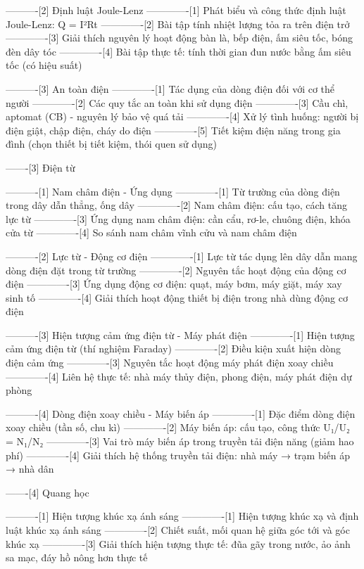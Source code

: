 ----------[2] Định luật Joule-Lenz
-------------[1] Phát biểu và công thức định luật Joule-Lenz: Q = I²Rt
-------------[2] Bài tập tính nhiệt lượng tỏa ra trên điện trở
-------------[3] Giải thích nguyên lý hoạt động bàn là, bếp điện, ấm siêu tốc, bóng đèn dây tóc
-------------[4] Bài tập thực tế: tính thời gian đun nước bằng ấm siêu tốc (có hiệu suất)

----------[3] An toàn điện
-------------[1] Tác dụng của dòng điện đối với cơ thể người
-------------[2] Các quy tắc an toàn khi sử dụng điện
-------------[3] Cầu chì, aptomat (CB) - nguyên lý bảo vệ quá tải
-------------[4] Xử lý tình huống: người bị điện giật, chập điện, cháy do điện
-------------[5] Tiết kiệm điện năng trong gia đình (chọn thiết bị tiết kiệm, thói quen sử dụng)

-------[3] Điện từ

----------[1] Nam châm điện - Ứng dụng
-------------[1] Từ trường của dòng điện trong dây dẫn thẳng, ống dây
-------------[2] Nam châm điện: cấu tạo, cách tăng lực từ
-------------[3] Ứng dụng nam châm điện: cần cẩu, rơ-le, chuông điện, khóa cửa từ
-------------[4] So sánh nam châm vĩnh cửu và nam châm điện

----------[2] Lực từ - Động cơ điện
-------------[1] Lực từ tác dụng lên dây dẫn mang dòng điện đặt trong từ trường
-------------[2] Nguyên tắc hoạt động của động cơ điện
-------------[3] Ứng dụng động cơ điện: quạt, máy bơm, máy giặt, máy xay sinh tố
-------------[4] Giải thích hoạt động thiết bị điện trong nhà dùng động cơ điện

----------[3] Hiện tượng cảm ứng điện từ - Máy phát điện
-------------[1] Hiện tượng cảm ứng điện từ (thí nghiệm Faraday)
-------------[2] Điều kiện xuất hiện dòng điện cảm ứng
-------------[3] Nguyên tắc hoạt động máy phát điện xoay chiều
-------------[4] Liên hệ thực tế: nhà máy thủy điện, phong điện, máy phát điện dự phòng

----------[4] Dòng điện xoay chiều - Máy biến áp
-------------[1] Đặc điểm dòng điện xoay chiều (tần số, chu kì)
-------------[2] Máy biến áp: cấu tạo, công thức U₁/U₂ = N₁/N₂
-------------[3] Vai trò máy biến áp trong truyền tải điện năng (giảm hao phí)
-------------[4] Giải thích hệ thống truyền tải điện: nhà máy → trạm biến áp → nhà dân

-------[4] Quang học

----------[1] Hiện tượng khúc xạ ánh sáng
-------------[1] Hiện tượng khúc xạ và định luật khúc xạ ánh sáng
-------------[2] Chiết suất, mối quan hệ giữa góc tới và góc khúc xạ
-------------[3] Giải thích hiện tượng thực tế: đũa gãy trong nước, ảo ảnh sa mạc, đáy hồ nông hơn thực tế

